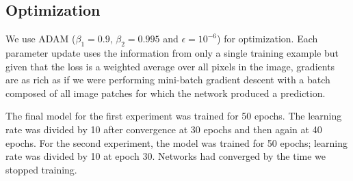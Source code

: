 \subsection{Optimization}
We use ADAM ($\beta_1 = 0.9$, $\beta_2 = 0.995$ and $\epsilon = 10^{-6}$) for optimization.
Each parameter update uses the information from only a single training example but given that the loss is a weighted average over all pixels in the image, gradients are as rich as if we were performing mini-batch gradient descent with a batch composed of all image patches for which the network produced a prediction.

The final model for the first experiment was trained for 50 epochs. The learning rate was divided by 10 after convergence at 30 epochs and then again at 40 epochs. For the second experiment, the model was trained for 50 epochs; learning rate was divided by 10 at epoch 30. Networks had converged by the time we stopped training.
